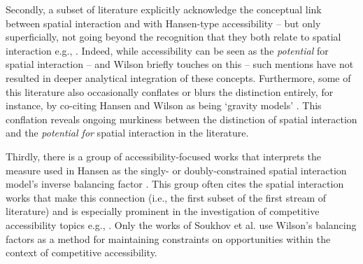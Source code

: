 \documentclass[
  10pt,
  letterpaper,
]{article}
\begin{document}
Secondly, a subset of literature explicitly acknowledge the conceptual
link between spatial interaction and with Hansen-type accessibility --
but only superficially, not going beyond the recognition that they both
relate to spatial interaction e.g.,
\citep{grengs2010job, millerMeasuringSpaceTimeAccessibility1999, giuliano2010accessibility, grengs2010intermetropolitan, grengs2012equity, levine2012does, levinson2012positive, tong2015transportation, liu2015spatial, he2017measuring, wuUnifyingAccess2020, ng2022reflection, naqavi2023mobility, suel2024measuring}.
Indeed, while accessibility can be seen as the \emph{potential} for
spatial interaction -- and Wilson \citep{wilson1971} briefly touches on
this -- such mentions have not resulted in deeper analytical integration
of these concepts. Furthermore, some of this literature also
occasionally conflates or blurs the distinction entirely, for instance,
by co-citing Hansen and Wilson as being `gravity models'
\citep[e.g.,][]{liu2004accessibility, dai2017visualization, shen2019segregation, chia2020extending}.
This conflation reveals ongoing murkiness between the distinction of
spatial interaction and the \emph{potential for} spatial interaction in
the literature.

Thirdly, there is a group of accessibility-focused works that interprets
the measure used in Hansen \citep{hansen1959} as the singly- or
doubly-constrained spatial interaction model's inverse balancing factor
\citep[e.g.,][]{vickermanAccessibilityAttractionPotential1974}. This
group often cites the spatial interaction works that make this
connection (i.e., the first subset of the first stream of literature)
and is especially prominent in the investigation of competitive
accessibility topics e.g.,
\citep{karstEvaluationAccessibilityImpacts2003, geurs2006accessibility, willigers2007accessibility, el2011place, curtis2010planning, manaugh2012makes, chen2013regional, alonso2014labour, albacete2017measuring, sahebgharani2019computing, mayaud2019future, allenMeasureCompetitiveAccess2020, levinsonGeneralTheoryAccess2020, marwal2022literature, su2023untangling}.
Only the works of Soukhov et al.
\citep{soukhovIntroducingSpatialAvailability2023, soukhovMultimodalSpatialAvailability2024}
use Wilson's \citep{wilson1971} balancing factors as a method for
maintaining constraints on opportunities within the context of
competitive accessibility.
\end{document}
